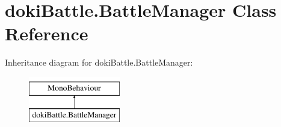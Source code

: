 \hypertarget{classdoki_battle_1_1_battle_manager}{}\section{doki\+Battle.\+Battle\+Manager Class Reference}
\label{classdoki_battle_1_1_battle_manager}
Inheritance diagram for doki\+Battle.\+Battle\+Manager\+:\begin{figure}[H]
\begin{center}
\leavevmode
\includegraphics[height=2.000000cm]{classdoki_battle_1_1_battle_manager}
\end{center}
\end{figure}
